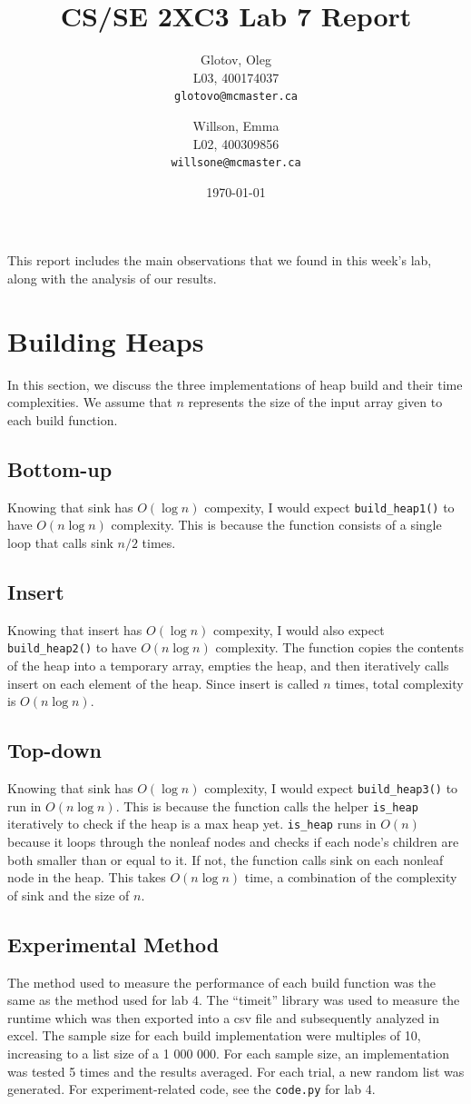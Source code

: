 \documentclass[12pt]{article}
\title{CS/SE 2XC3 Lab 7 Report}
\author{
  Glotov, Oleg\\ L03, 400174037\\
  \texttt{glotovo@mcmaster.ca}
  \and
  Willson, Emma\\ L02, 400309856\\
  \texttt{willsone@mcmaster.ca}
  }
\date{\today}
\begin{document}
\maketitle

This report includes the main observations that we found in this week's lab, along with the analysis of our results.

\newpage 
\section{Building Heaps}
In this section, we discuss the three implementations of heap build and their time complexities. We assume that $n$ represents the size of the input array given to each build function.
\subsection{Bottom-up}
Knowing that sink has $O(\log{n})$ compexity, I would expect \verb+build_heap1()+ to have $O(n\log{n})$ complexity. This is because the function consists of a single loop that calls sink $n/2$ times. 
\subsection{Insert}
Knowing that insert has $O(\log{n})$ compexity, I would also expect \verb+build_heap2()+ to have $O(n\log{n})$ complexity. The function copies the contents of the heap into a temporary array, empties the heap, and then iteratively calls insert on each element of the heap. Since insert is called $n$ times, total complexity is $O(n\log{n})$.
\subsection{Top-down}
Knowing that sink has $O(\log{n})$ complexity, I would expect \verb+build_heap3()+ to run in $O(n\log{n})$. This is because the function calls the helper \verb+is_heap+ iteratively to check if the heap is a max heap yet. \verb+is_heap+ runs in $O(n)$ because it loops through the nonleaf nodes and checks if each node's children are both smaller than or equal to it. If not, the function calls sink on each nonleaf node in the heap. This takes $O(n\log{n})$ time, a combination of the complexity of sink and the size of $n$. 
\subsection{Experimental Method}
The method used to measure the performance of each build function was the same as the method used for lab 4. The “timeit” library was used to measure the runtime which was then exported into a csv file and subsequently analyzed in excel. The sample size for each build implementation were multiples of 10, increasing to a list size of a 1 000 000. For each sample size, an implementation was tested 5 times and the results averaged. For each trial, a new random list was generated. For experiment-related code, see the \verb+code.py+ for lab 4.
\end{document}
